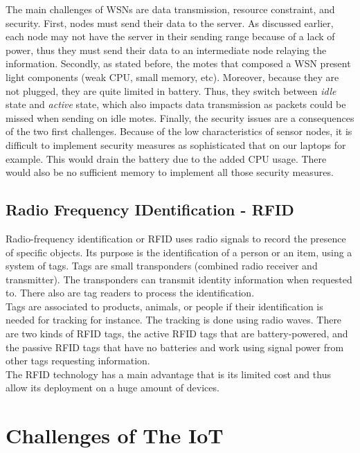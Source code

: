 The main challenges of WSNs are data transmission, resource constraint, and security. First, nodes must send their data to the server. As discussed earlier, each node may not have the server in their sending range because of a lack of power, thus they must send their data to an intermediate node relaying the information. Secondly, as stated before, the motes that composed a WSN present light components (weak CPU, small memory, etc). Moreover, because they are not plugged, they are quite limited in battery. Thus, they switch between \textit{idle} state and \textit{active} state, which also impacts data transmission as packets could be missed when sending on idle motes. Finally, the security issues are a consequences of the two first challenges. Because of the low characteristics of sensor nodes, it is difficult to implement security measures as sophisticated that on our laptops for example. This would drain the battery due to the added CPU usage. There would also be no sufficient memory to implement all those security measures.\\

\subsection{Radio Frequency IDentification - RFID}

Radio-frequency identification or RFID uses radio signals to record the presence of specific objects. Its purpose is the identification of a person or an item, using a system of tags. Tags are small transponders (combined radio receiver and transmitter). The transponders can transmit identity information when requested to. There also are tag readers to process the identification.\\

Tags are associated to products, animals, or people if their identification is needed for tracking for instance. The tracking is done using radio waves. There are two kinds of RFID tags, the active RFID tags that are battery-powered, and the passive RFID tags that have no batteries and work using signal power from other tags requesting information.\\

The RFID technology has a main advantage that is its limited cost and thus allow its deployment on a huge amount of devices.

\section{Challenges of The IoT}

